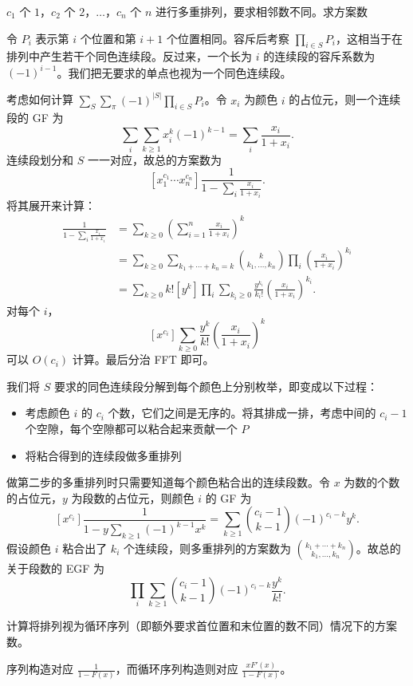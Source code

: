 \begin{example}[{P2476 [SCOI2008] 着色方案}]
    $c_1$ 个 $1$，$c_2$ 个 $2$，$\ldots$，$c_n$ 个 $n$ 进行多重排列，要求相邻数不同。求方案数
\end{example}
\begin{solution}
    令 $P_i$ 表示第 $i$ 个位置和第 $i+1$ 个位置相同。容斥后考察 $\prod_{i\in S}P_i$，这相当于在排列中产生若干个同色连续段。反过来，一个长为 $i$ 的连续段的容斥系数为 $(-1)^{i-1}$。我们把无要求的单点也视为一个同色连续段。
    
    考虑如何计算 $\sum_S \sum_{\pi}(-1)^{|S|} \prod_{i\in S}P_i$。令 $x_i$ 为颜色 $i$ 的占位元，则一个连续段的 GF 为
    $$
    \sum_i \sum_{k\ge 1}x_i^k(-1)^{k-1}=\sum_i \frac{x_i}{1+x_i}.
    $$
    连续段划分和 $S$ 一一对应，故总的方案数为
    $$
    [x_1^{c_1}\cdots x_n^{c_n}]\frac{1}{1-\sum_i \frac{x_i}{1+x_i}}.
    $$
    将其展开来计算：
    $$
    \begin{aligned}
    \frac{1}{1-\sum_i \frac{x_i}{1+x_i}}&=\sum_{k\ge 0}\left(\sum_{i=1}^n \frac{x_i}{1+x_i}\right)^k\\
    &=\sum_{k\ge 0}\sum_{k_1+\cdots+k_n=k}\binom{k}{k_1,\ldots,k_n}\prod_i \left(\frac{x_i}{1+x_i}\right)^{k_i}\\
    &=\sum_{k\ge 0}k![y^k]\prod_{i}\sum_{k_i\ge 0}\frac{y^{k_i}}{k_i!}\left(\frac{x_i}{1+x_i}\right)^{k_i}.
    \end{aligned}
    $$
    对每个 $i$，
    $$
    [x^{c_i}]\sum_{k\ge 0}\frac{y^{k}}{k!}\left(\frac{x_i}{1+x_i}\right)^{k}
    $$
    可以 $O(c_i)$ 计算。最后分治 FFT 即可。
\end{solution}
\begin{solution}[另解]
    我们将 $S$ 要求的同色连续段分解到每个颜色上分别枚举，即变成以下过程：
    \begin{itemize}
        \item 考虑颜色 $i$ 的 $c_i$ 个数，它们之间是无序的。将其排成一排，考虑中间的 $c_i-1$ 个空隙，每个空隙都可以粘合起来贡献一个 $P$
        \item 将粘合得到的连续段做多重排列
    \end{itemize}
    做第二步的多重排列时只需要知道每个颜色粘合出的连续段数。令 $x$ 为数的个数的占位元，$y$ 为段数的占位元，则颜色 $i$ 的 GF 为
    $$
    [x^{c_i}]\frac{1}{1-y\sum_{k\ge 1}(-1)^{k-1}x^k}=\sum_{k\ge 1}\binom{c_i-1}{k-1}(-1)^{c_i-k}y^k.
    $$
    假设颜色 $i$ 粘合出了 $k_i$ 个连续段，则多重排列的方案数为 $\binom{k_1+\cdots+k_n}{k_1,\ldots,k_n}$。故总的关于段数的 EGF 为
    $$
    \prod_i \sum_{k\ge 1}\binom{c_i-1}{k-1}(-1)^{c_i-k}\frac{y^{k}}{k!}.
    $$
\end{solution}
\begin{exercise}
    计算将排列视为循环序列（即额外要求首位置和末位置的数不同）情况下的方案数。
    \begin{hint}
    序列构造对应 $\frac{1}{1-F(x)}$，而循环序列构造则对应 $\frac{xF'(x)}{1-F(x)}$。
    \end{hint}
\end{exercise}

